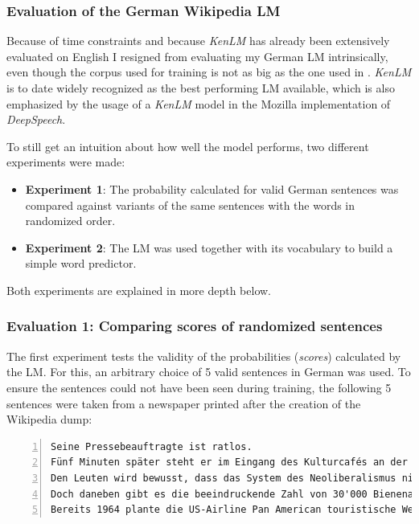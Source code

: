 \subsubsection{Evaluation of the German Wikipedia \ac{LM}}

Because of time constraints and because \textit{KenLM} has already been extensively evaluated on English I resigned from evaluating my German \ac{LM} intrinsically, even though the corpus used for training is not as big as the one used in \cite{kenlm_estimation}. \textit{KenLM} is to date widely recognized as the best performing \ac{LM} available, which is also emphasized by the usage of a \textit{KenLM} model in the Mozilla implementation of \textit{DeepSpeech}.

To still get an intuition about how well the model performs, two different experiments were made:

\begin{itemize}
	\item \textbf{Experiment 1}: The probability calculated for valid German sentences was compared against variants of the same sentences with the words in randomized order.
	\item \textbf{Experiment 2}: The \ac{LM} was used together with its vocabulary to build a simple word predictor.
\end{itemize}

Both experiments are explained in more depth below.

\subsubsection{Evaluation 1: Comparing scores of randomized sentences}

The first experiment tests the validity of the probabilities (\textit{scores}) calculated by the \ac{LM}. For this, an arbitrary choice of 5 valid sentences in German was used. To ensure the sentences could not have been seen during training, the following 5 sentences were taken from a newspaper printed after the creation of the Wikipedia dump:

\begin{lstlisting}[numbers=left, caption=Representation in corpus]
Seine Pressebeauftragte ist ratlos.
Fünf Minuten später steht er im Eingang des Kulturcafés an der Zürcher Europaallee.
Den Leuten wird bewusst, dass das System des Neoliberalismus nicht länger tragfähig ist.
Doch daneben gibt es die beeindruckende Zahl von 30'000 Bienenarten, die man unter dem Begriff «Wildbienen» zusammenfasst.
Bereits 1964 plante die US-Airline Pan American touristische Weltraumflüge für das Jahr 2000.
\end{lstlisting}

